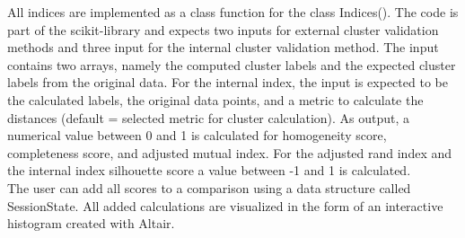All indices are implemented as a class function for the class Indices(). The code is part of the scikit-library \cite{scikitlearn} and expects two inputs for external cluster validation methods and three input for the internal cluster validation method. The input contains two arrays, namely the computed cluster labels and the expected cluster labels from the original data. For the internal index, the input is expected to be the calculated labels, the original data points, and a metric to calculate the distances (default = selected metric for cluster calculation). As output, a numerical value between 0 and 1 is calculated for homogeneity score, completeness score, and adjusted mutual index. For the adjusted rand index and the internal index silhouette score a value between -1 and 1 is calculated.\\
The user can add all scores to a comparison using a data structure called SessionState. All added calculations are visualized in the form of an interactive histogram created with Altair.  
